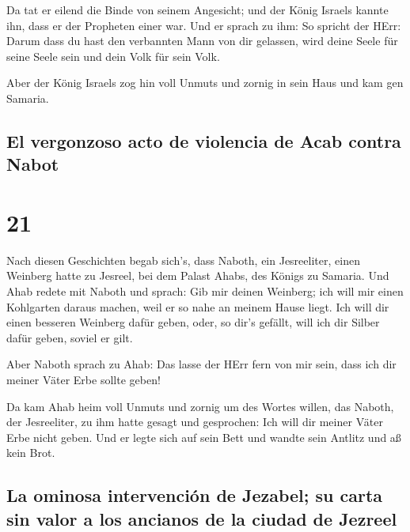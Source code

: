  Da tat er eilend die Binde von seinem Angesicht; und der
König Israels kannte ihn, dass er der Propheten einer war.
 Und er sprach zu ihm: So spricht der HErr: Darum dass du
hast den verbannten Mann von dir gelassen, wird deine Seele für seine
Seele sein und dein Volk für sein Volk.

 Aber der König Israels zog hin voll Unmuts und zornig in
sein Haus und kam gen Samaria.

\hypertarget{el-vergonzoso-acto-de-violencia-de-acab-contra-nabot}{%
\subsection{El vergonzoso acto de violencia de Acab contra
Nabot}\label{el-vergonzoso-acto-de-violencia-de-acab-contra-nabot}}

\hypertarget{section-20}{%
\section{21}\label{section-20}}

 Nach diesen Geschichten begab sich's, dass Naboth, ein
Jesreeliter, einen Weinberg hatte zu Jesreel, bei dem Palast Ahabs, des
Königs zu Samaria.  Und Ahab redete mit Naboth und sprach:
Gib mir deinen Weinberg; ich will mir einen Kohlgarten daraus machen,
weil er so nahe an meinem Hause liegt. Ich will dir einen besseren
Weinberg dafür geben, oder, so dir's gefällt, will ich dir Silber dafür
geben, soviel er gilt.

 Aber Naboth sprach zu Ahab: Das lasse der HErr fern von
mir sein, dass ich dir meiner Väter Erbe sollte geben!

 Da kam Ahab heim voll Unmuts und zornig um des Wortes
willen, das Naboth, der Jesreeliter, zu ihm hatte gesagt und gesprochen:
Ich will dir meiner Väter Erbe nicht geben. Und er legte sich auf sein
Bett und wandte sein Antlitz und aß kein Brot.

\hypertarget{la-ominosa-intervenciuxf3n-de-jezabel-su-carta-sin-valor-a-los-ancianos-de-la-ciudad-de-jezreel}{%
\subsection{La ominosa intervención de Jezabel; su carta sin valor a los
ancianos de la ciudad de
Jezreel}\label{la-ominosa-intervenciuxf3n-de-jezabel-su-carta-sin-valor-a-los-ancianos-de-la-ciudad-de-jezreel}}


